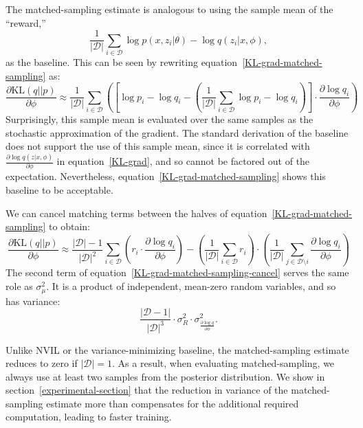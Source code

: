 \documentclass{article} %
\def\KL{\text{KL}}
\begin{document}
The matched-sampling estimate is analogous to using the sample mean of the ``reward,''
\begin{equation*}
\frac{1}{|\mathcal{D}|} \sum_{i \in \mathcal{D}} \log p(x,z_i | \theta) - \log q(z_i | x, \phi),
\end{equation*}
as the baseline.  
This can be seen by rewriting equation~\ref{KL-grad-matched-sampling} as:
\begin{equation*}
\frac{\partial \KL(q||p)}{\partial \phi}  \approx 
\frac{1}{|\mathcal{D}|} \sum_{i \in \mathcal{D}}\left( \left[ \log p_i - \log q_i - \left( \frac{1}{|\mathcal{D}|} \sum_{i \in \mathcal{D}} \log p_i - \log q_i \right) \right]  \cdot \frac{\partial \log q_i}{\partial \phi} \right)
\end{equation*}
Surprisingly, this sample mean is evaluated over the same samples as the stochastic approximation of the gradient.  
The standard derivation of the baseline does not support the use of this sample mean, since it is correlated with $\frac{\partial \log q(z | x, \phi)}{\partial \phi}$ in equation~\ref{KL-grad}, and so cannot be factored out of the expectation.  Nevertheless, equation~\ref{KL-grad-matched-sampling} shows this baseline to be acceptable.

We can cancel matching terms between the halves of equation~\ref{KL-grad-matched-sampling} to obtain:
\begin{equation} \label{KL-grad-matched-sampling-cancel}
\frac{\partial \KL(q||p)}{\partial \phi}  \approx \frac{|\mathcal{D}| - 1}{|\mathcal{D}|^2} \sum_{i \in \mathcal{D}}\left( r_i \cdot \frac{\partial \log q_i}{\partial \phi} \right) - \left( \frac{1}{|\mathcal{D}|} \sum_{i \in \mathcal{D}} r_i \right) \cdot \left( \frac{1}{|\mathcal{D}|} \sum_{j \in \mathcal{D} \setminus i} \frac{\partial \log q_i}{\partial \phi} \right)
\end{equation}
The second term of equation~\ref{KL-grad-matched-sampling-cancel} serves the same role as $\sigma_{\mu}^2$.  It is a product of independent, mean-zero random variables, and so has variance:
\begin{equation*}
\frac{|\mathcal{D} - 1|}{|\mathcal{D}|^3} \cdot \sigma_R^2 \cdot \sigma_{\frac{\partial \log q}{\partial \phi}}^2 .
\end{equation*}


Unlike NVIL or the variance-minimizing baseline, the matched-sampling estimate reduces to zero if $|\mathcal{D}| = 1$.  As a result, when evaluating matched-sampling, we always use at least two samples from the posterior distribution.  We show in section~\ref{experimental-section} that the reduction in variance of the matched-sampling estimate more than compensates for the additional required computation, leading to faster training.  
\end{document}
